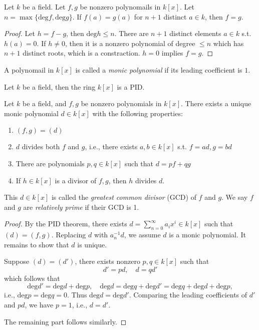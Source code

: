 \begin{corollary}
Let $k$ be a field. Let $f,g$ be nonzero polynomails in $k[x]$. Let $n=\max\{\mbox{deg}f,\mbox{deg}g\}$. If $f(a)=g(a)$ for $n+1$ distinct $a\in k$, then $f=g$.
\end{corollary}
\begin{proof}
Let $h=f-g$, then $\mbox{deg}h\le n$. There are $n+1$ distinct elements $a\in k$ s.t. $h(a)=0$. If $h\ne0$, then it is a nonzero polynomial of degree $\le n$ which has $n+1$ distinct roots, which is a constraction. $h=0$ implies $f=g$.
\end{proof}
\begin{definition}
A polynomail in $k[x]$ is called a \emph{monic polynomial} if its leading coefficient is $1$.
\end{definition}
\begin{theorem}
Let $k$ be a field, then the ring $k[x]$ is a PID.
\end{theorem}
\begin{corollary}
Let $k$ be a field, and $f,g$ be nonzero polynomials in $k[x]$. There exists a unique monic polynomial $d\in k[x]$ with the following properties:
\begin{enumerate}
\item
$(f,g)=(d)$
\item
$d$ divides both $f$ and $g$, i.e., there exists $a,b\in k[x]$ s.t. $f=ad,g=bd$
\item
There are polynomials $p,q\in k[x]$ such that $d=pf+qg$
\item
If $h\in k[x]$ is a divisor of $f,g$, then $h$ divides $d$.	
\end{enumerate}
This $d\in k[x]$ is called the \emph{greatest common divisor} (GCD) of $f$ and $g$. We say $f$ and $g$ are \emph{relatively prime} if their GCD is 1.
\end{corollary}
\begin{proof}
By the PID theorem, there exists $d=\sum_{n=0}^\infty a_ix^i\in k[x]$ such that $(d)=(f,g)$. Replacing $d$ with $a_n^{-1}d$, we assume $d$ is a monic polynomial. It remains to show that $d$ is unique. 

Suppose $(d)=(d')$, there exists nonzero $p,q\in k[x]$ such that
\[
d'=pd,\quad
d=qd'
\]
which follows that
\[
\mbox{deg}d'=\mbox{deg}d+\mbox{deg}p,\quad
\mbox{deg}d=\mbox{deg}q+\mbox{deg}d'=\mbox{deg}q+\mbox{deg}d+\mbox{deg}p,
\]
i.e., $\mbox{deg}p=\mbox{deg}q=0$. Thus $\mbox{deg}d=\mbox{deg}d'$. Comparing the leading coefficients of $d'$ and $pd$, we have $p=1$, i.e., $d=d'$.

The remaining part follows similarly.
\end{proof}
